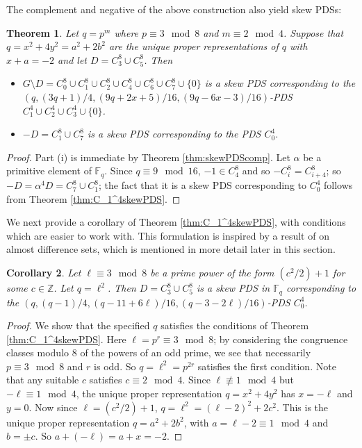\documentclass[12pt, a4paper]{article}
\newtheorem{theorem}{Theorem}[section]
\newtheorem{corollary}[theorem]{Corollary}
\theoremstyle{definition}
\begin{document}
The complement and negative of the above construction also yield skew PDSs:

\begin{theorem}
Let $q=p^m$ where $p \equiv 3 \mod 8$ and $m \equiv 2 \mod 4$.
Suppose that $q=x^2+4y^2=a^2+2b^2$ are the unique proper representations of $q$ with $x+a=-2$ and let $D=C_3^8 \cup C_5^8$. Then
\begin{itemize}
\item[(i)]
		$G \setminus D=C_0^8 \cup C_1^8 \cup C_2^8 \cup C_4^8 \cup C_6^8 \cup C_7^8 \cup \{0\}$ is a skew PDS corresponding to the $(q,(3q+1)/4,(9q + 2x + 5)/16,(9q-6x-3)/16)$-PDS $C_1^4 \cup C_2^4 \cup C_3^4 \cup \{0\}$.
\item[(ii)] $-D=C_1^8 \cup C_7^8$  is a skew PDS corresponding to the PDS $C_0^4$.
\end{itemize}
\end{theorem}
\begin{proof}
Part (i) is immediate by Theorem \ref{thm:skewPDScomp}. 
Let $\alpha$ be a primitive element of $\mathbb{F}_q$.  Since $q \equiv 9 \mod 16$, $-1 \in C_4^8$ and so $-C_i^8=C_{i+4}^8$; so $-D=\alpha^4 D=C_7^8 \cup C_1^8$; the fact that it is a skew PDS corresponding to $C_0^4$ follows from Theorem \ref{thm:C_1^4skewPDS}.
\end{proof}
	

We next provide a corollary of Theorem \ref{thm:C_1^4skewPDS}, with conditions which are easier to work with.  This formulation is inspired by a result of \cite{DinPotWan} on almost difference sets, which is mentioned in more detail later in this section.
\begin{corollary}\label{cor:C_1^4skewPDS}
Let $\ell \equiv 3 \mod 8$ be a prime power of the form $(c^2/2)+1$ for some $c \in \mathbb{Z}$. Let $q=\ell^2$.  
Then $D=C_3^8 \cup C_5^8$ is a skew PDS in $\mathbb{F}_q$ corresponding to the $(q,(q-1)/4,(q-11+6\ell)/16,(q-3-2\ell)/16)$-PDS $C_0^4$.
\end{corollary}
\begin{proof}
We show that the specified $q$ satisfies the conditions of Theorem \ref{thm:C_1^4skewPDS}. Here $\ell=p^r \equiv 3 \mod 8$; by considering the congruence classes modulo $8$ of the powers of an odd prime, we see that necessarily $p \equiv 3 \mod 8$ and $r$ is odd. So $q=\ell^2=p^{2r}$ satisfies the first condition.  Note that any suitable $c$ satisfies $c \equiv 2 \mod 4$. Since $\ell \not\equiv 1 \mod 4$ but $-\ell \equiv 1 \mod 4$,  the unique proper representation $q=x^2+4y^2$ has $x=-\ell$ and $y=0$. Now since $\ell=(c^2/2)+1$, $q=\ell^2=(\ell-2)^2+2c^2$. This is the unique proper representation $q=a^2+2b^2$, with $a=\ell-2 \equiv 1 \mod 4$ and $b=\pm c$.  So $a+(-\ell)=a+x=-2$.
\end{proof}
\end{document}
